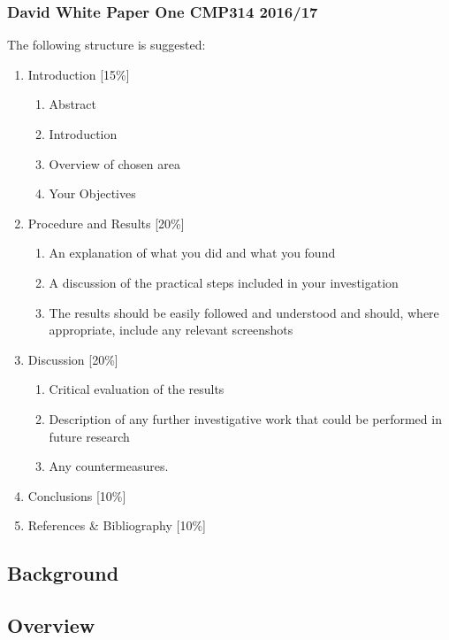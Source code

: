 \documentclass[12pt,a4paper]{article}
\begin{document}
			\subsubsection{David White Paper One CMP314 2016/17}
				The following structure is suggested:
				\begin{enumerate}
					\item{Introduction [15\%]}
						\begin{enumerate}
							\item{Abstract}
							\item{Introduction}
							\item{Overview of chosen area}
							\item{Your Objectives}
						\end{enumerate}
					\item{Procedure and Results [20\%]}
						\begin{enumerate}
							\item{An explanation of what you did and what you found}
							\item{A discussion of the practical steps included in your investigation}
							\item{The results should be easily followed and understood and should, where appropriate, include any relevant screenshots}
						\end{enumerate}
					\item{Discussion [20\%]}
						\begin{enumerate}
							\item{Critical evaluation of the results} 
							\item{Description of any further investigative work that could be performed in future research}
							\item{Any countermeasures.}
						\end{enumerate}
					\item{Conclusions [10\%]}
					\item {References \& Bibliography [10\%]}
				\end{enumerate}	
				
	\newpage

		\subsection{Background}

		\subsection{Overview}
		
\end{document}
